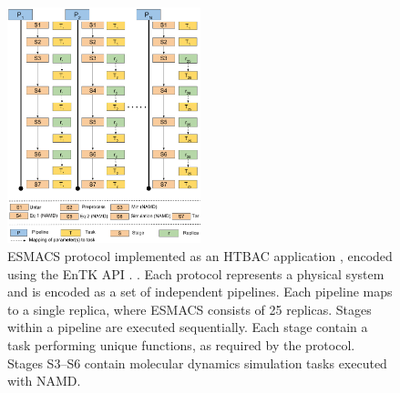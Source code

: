 
\begin{figure}
\centering
  \includegraphics[width=0.5\textwidth]{FIGURES/HTBAC_Workflow_ESMACS.pdf}
  \caption{ESMACS protocol implemented as an HTBAC
  application  , encoded using the EnTK %
  API . . 
  Each protocol represents a physical system and is %
  encoded as a set of independent pipelines. Each pipeline maps to a single
  replica, where ESMACS consists of 25 replicas. Stages within a pipeline
  are executed sequentially. Each stage contain a task   performing unique
  functions, as required by the protocol. Stages S3--S6 contain molecular
  dynamics simulation tasks executed with NAMD\@.}\label{figure:HTBAC}
\end{figure}



